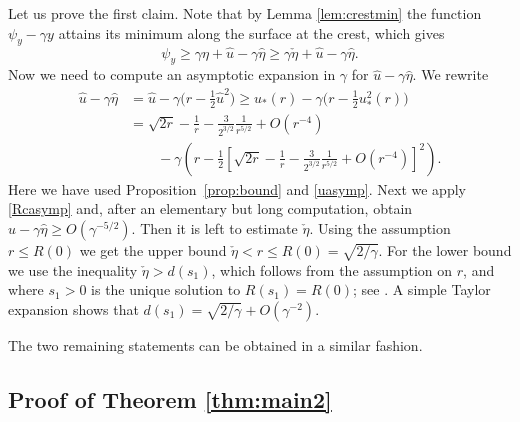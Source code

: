 \documentclass[pdflatex,sn-mathphys-num]{sn-jnl}%
\numberwithin{equation}{section}
\theoremstyle{thmstyleone}
\begin{document}
Let us prove the first claim. Note that by Lemma \ref{lem:crestmin} the function $\psi_y - \gamma y$ attains its minimum along the surface at the crest, which gives
\[
\psi_y \geq \gamma \eta + \hat{u}- \gamma\hat{\eta} \geq \gamma \check{\eta} + \hat{u}- \gamma\hat{\eta}.
\]
Now we need to compute an asymptotic expansion in $\gamma$ for $\hat{u}- \gamma\hat{\eta}$. We rewrite
\begin{align*}
  \hat{u}- \gamma\hat{\eta} 
  &= 
  \hat{u}- \gamma\big(r - \tfrac 12 \hat{u}^2\big) 
  \ge u_*(r) - \gamma\big(r - \tfrac 12 u_*^2(r)\big) \\
  &= 
  \sqrt{2r} - \frac 1r - \frac 3{2^{3/2}} \frac 1{r^{5/2}} + O(r^{-4}) 
  \\&\qquad 
  - \gamma \left( r  - \frac12 \left[\sqrt{2r} - \frac 1r - \frac 3{2^{3/2}} \frac 1{r^{5/2}} 
  + O(r^{-4})\right]^2\right).
\end{align*}
Here we have used Proposition~\ref{prop:bound} and \eqref{uasymp}.
%
Next we apply \eqref{Rcasymp} and, after an elementary but long computation, obtain $\hat{u}- \gamma\hat{\eta} \geq O(\gamma^{-5/2})$. 
%
Then it is left to estimate $\check{\eta}$. Using the assumption $r \le R(0)$ we get the upper bound $\check{\eta} < r \le R(0) = \sqrt{2/\gamma}$. For the lower bound we use the inequality $\check{\eta}>d(s_1)$, which follows from the assumption on $r$, and where $s_1 > 0$ is the unique solution to $R(s_1) = R(0)$; see \cite{Kozlov2015}. A simple Taylor expansion shows that $d(s_1) = \sqrt{2/\gamma} + O(\gamma^{-2})$. 

The two remaining statements can be obtained in a similar fashion.

\subsection{Proof of Theorem \ref{thm:main2}}
\end{document}
